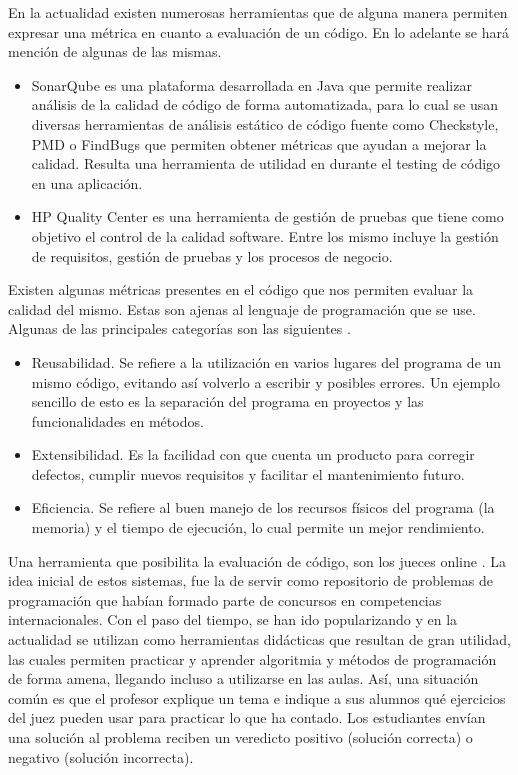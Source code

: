 \documentclass[a4paper,openright,11pt,oneside]{book}
\begin{document}
	En la actualidad existen numerosas herramientas que de alguna manera permiten expresar una métrica en cuanto a evaluación de un código. En lo adelante se hará mención de algunas de las mismas.
	
	\begin{itemize}
		\item SonarQube es una plataforma desarrollada en Java que permite realizar análisis de la calidad de código de forma automatizada, para lo cual se usan diversas herramientas de análisis estático de código fuente como Checkstyle, PMD o FindBugs que permiten obtener métricas que ayudan a mejorar la calidad. Resulta una herramienta de utilidad en durante el testing de código en una aplicación.
		
		\item HP Quality Center es una herramienta de gestión de pruebas que tiene como objetivo el control de la calidad software. Entre los mismo incluye la gestión de requisitos, gestión de pruebas y los procesos de negocio.
	\end{itemize}
	
	Existen algunas métricas presentes en el código que nos permiten evaluar la calidad del mismo. Estas son ajenas al lenguaje de programación que se use. Algunas de las principales categorías son las siguientes \cite{callejas2017modelos}.
	
	\begin{itemize}
		\item Reusabilidad. Se refiere a la utilización en varios lugares del programa de un mismo código, evitando así volverlo a escribir y posibles errores. Un ejemplo sencillo de esto es la separación del programa en proyectos y las funcionalidades en métodos.
		
		\item Extensibilidad. Es la facilidad con que cuenta un producto para corregir defectos, cumplir nuevos requisitos y facilitar el mantenimiento futuro.

		\item Eficiencia. Se refiere al buen manejo de los recursos físicos del programa (la memoria) y el tiempo de ejecución, lo cual permite un mejor rendimiento.
	\end{itemize}

	Una herramienta que posibilita la evaluación de código, son los jueces online \cite{hernandez2017feedback}. La idea inicial de estos sistemas, fue la de servir como repositorio de problemas de programación que habían formado parte de concursos en competencias internacionales. Con el paso del tiempo, se han ido popularizando y en la actualidad se utilizan como herramientas didácticas que resultan de gran utilidad, las cuales permiten practicar y aprender algoritmia y métodos de programación de forma amena, llegando incluso a utilizarse en las aulas. Así, una situación común es que el profesor explique un tema e indique a sus alumnos qué ejercicios del juez pueden usar para practicar lo que ha contado. Los estudiantes envían una solución al problema reciben un veredicto positivo (solución correcta) o negativo (solución incorrecta).
	
\end{document}
